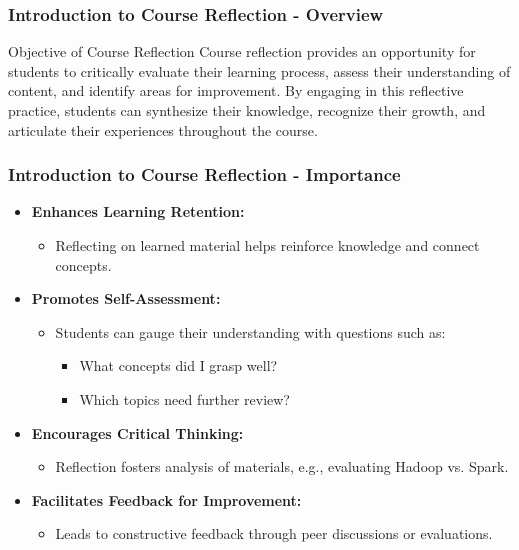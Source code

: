 \documentclass[aspectratio=169]{beamer}
\begin{document}
\frame{\titlepage}

\begin{frame}[fragile]
    \frametitle{Introduction to Course Reflection - Overview}
    \begin{block}{Objective of Course Reflection}
        Course reflection provides an opportunity for students to critically evaluate their learning process, assess their understanding of content, and identify areas for improvement. By engaging in this reflective practice, students can synthesize their knowledge, recognize their growth, and articulate their experiences throughout the course.
    \end{block}
\end{frame}

\begin{frame}[fragile]
    \frametitle{Introduction to Course Reflection - Importance}
    \begin{itemize}
        \item \textbf{Enhances Learning Retention:}
        \begin{itemize}
            \item Reflecting on learned material helps reinforce knowledge and connect concepts.
        \end{itemize}

        \item \textbf{Promotes Self-Assessment:}
        \begin{itemize}
            \item Students can gauge their understanding with questions such as:
            \begin{itemize}
                \item What concepts did I grasp well?
                \item Which topics need further review?
            \end{itemize}
        \end{itemize}

        \item \textbf{Encourages Critical Thinking:}
        \begin{itemize}
            \item Reflection fosters analysis of materials, e.g., evaluating Hadoop vs. Spark.
        \end{itemize}

        \item \textbf{Facilitates Feedback for Improvement:}
        \begin{itemize}
            \item Leads to constructive feedback through peer discussions or evaluations.
        \end{itemize}
    \end{itemize}
\end{frame}
\end{document}
